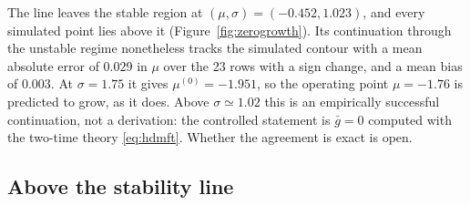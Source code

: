 \documentclass[11pt]{article}
\begin{document}
The line leaves the stable region at $(\mu,\sigma)=(-0.452,1.023)$, and every simulated point lies
above it (Figure~\ref{fig:zerogrowth}).  Its continuation through the unstable regime nonetheless
tracks the simulated contour with a mean absolute error of $0.029$ in $\mu$ over the 23 rows
with a sign change, and a mean bias of $0.003$.  At $\sigma=1.75$ it gives $\mu^{(0)}=-1.951$, so
the operating point $\mu=-1.76$ is predicted to grow, as it does.  Above $\sigma\simeq1.02$ this is
an empirically successful continuation, not a derivation: the controlled statement is
$\bar g=0$ computed with the two-time theory \eqref{eq:hdmft}.  Whether the agreement is exact
is open.

\subsection{Above the stability line}
\label{sec:above}
\end{document}
